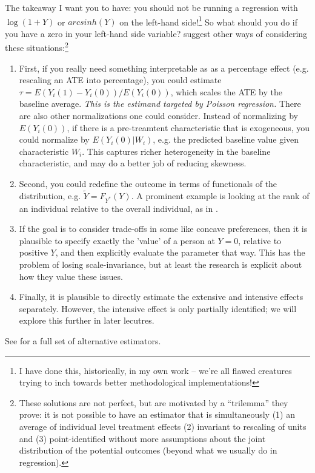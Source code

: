 \documentclass{tufte-handout}
\theoremstyle{break}
\begin{document}
The takeaway I want you to have: you should not be running a regression with $\log(1+Y)$ or $arcsinh(Y)$ on the left-hand side!\footnote{I have done this, historically, in my own work -- we're all flawed creatures trying to inch towards better methodological implementations!} So what should you do if you have a zero in your left-hand side variable? \citet{chen2023logs} suggest other ways of considering these situations:\footnote{These solutions are not perfect, but are motivated by a ``trilemma'' they prove: it is not possible to have an estimator that is simultaneously (1) an average of individual level treatment effects (2) invariant to rescaling of units and (3) point-identified without more assumptions about the joint distribution of the potential outcomes (beyond what we usually do in regression).}
\begin{enumerate}
  \item First, if you really need something interpretable as as a percentage effect (e.g. rescaling an ATE into percentage), you could estimate $\tau = E(Y_{i}(1) - Y_{i}(0)) / E(Y_{i}(0))$, which scales the ATE by the baseline average. \emph{This is the estimand targeted by Poisson regression.} There are also other normalizations one could consider. Instead of normalizing by $E(Y_{i}(0))$, if there is a pre-treamtent characteristic that is exogeneous, you could normalize by $E(Y_{i}(0) | W_{i})$, e.g. the predicted baseline value given characteristic $W_{i}$. This captures richer heterogeneity in the baseline characteristic, and may do a better job of reducing skewness. 
  \item Second, you could redefine the outcome in terms of functionals of the distribution, e.g. $\tilde{Y} = F_{Y^{*}}(Y)$. A prominent example is looking at the rank of an individual relative to the overall individual, as in \citet{chetty2014land}. 
  \item If the goal is to consider trade-offs in some like concave preferences, then it is plausible to specify exactly the 'value' of a person at $Y = 0$, relative to positive $Y$, and then explicitly evaluate the parameter that way. This has the problem of losing scale-invariance, but at least the research is explicit about how they value these issues.
  \item Finally, it is plausible to directly estimate the extensive and intensive effects separately. However, the intensive effect is only partially identified; we will explore this further in later lecutres. 
\end{enumerate}
See  for a full set of alternative estimators. 
\end{document}

